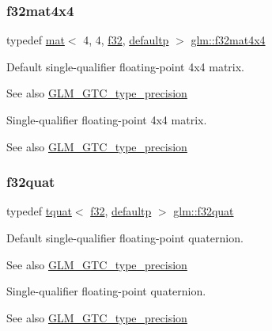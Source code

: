\subsubsection{\texorpdfstring{f32mat4x4}{f32mat4x4}}
{\footnotesize\ttfamily typedef \mbox{\hyperlink{structglm_1_1mat}{mat}}$<$ 4, 4, \mbox{\hyperlink{group__gtc__type__precision_ga0ec999b57f5330d9021256e96038df04}{f32}}, \mbox{\hyperlink{namespaceglm_a36ed105b07c7746804d7fdc7cc90ff25a9d21ccd8b5a009ec7eb7677befc3bf51}{defaultp}} $>$ \mbox{\hyperlink{group__gtc__type__precision_ga2ba95a5c37eef05b26ac10e03daa5c84}{glm\+::f32mat4x4}}}

Default single-\/qualifier floating-\/point 4x4 matrix. \begin{DoxySeeAlso}{See also}
\mbox{\hyperlink{group__gtc__type__precision}{G\+L\+M\+\_\+\+G\+T\+C\+\_\+type\+\_\+precision}}
\end{DoxySeeAlso}
Single-\/qualifier floating-\/point 4x4 matrix. \begin{DoxySeeAlso}{See also}
\mbox{\hyperlink{group__gtc__type__precision}{G\+L\+M\+\_\+\+G\+T\+C\+\_\+type\+\_\+precision}} 
\end{DoxySeeAlso}
\mbox{\label{group__gtc__type__precision_gac59c4d798396552e4bbb866b3d8a2f18}} 
\subsubsection{\texorpdfstring{f32quat}{f32quat}}
{\footnotesize\ttfamily typedef \mbox{\hyperlink{structglm_1_1tquat}{tquat}}$<$ \mbox{\hyperlink{group__gtc__type__precision_ga0ec999b57f5330d9021256e96038df04}{f32}}, \mbox{\hyperlink{namespaceglm_a36ed105b07c7746804d7fdc7cc90ff25a9d21ccd8b5a009ec7eb7677befc3bf51}{defaultp}} $>$ \mbox{\hyperlink{group__gtc__type__precision_gac59c4d798396552e4bbb866b3d8a2f18}{glm\+::f32quat}}}

Default single-\/qualifier floating-\/point quaternion. \begin{DoxySeeAlso}{See also}
\mbox{\hyperlink{group__gtc__type__precision}{G\+L\+M\+\_\+\+G\+T\+C\+\_\+type\+\_\+precision}}
\end{DoxySeeAlso}
Single-\/qualifier floating-\/point quaternion. \begin{DoxySeeAlso}{See also}
\mbox{\hyperlink{group__gtc__type__precision}{G\+L\+M\+\_\+\+G\+T\+C\+\_\+type\+\_\+precision}} 
\end{DoxySeeAlso}
\mbox{\label{group__gtc__type__precision_ga27d40e360fd5b6ad39ca34ded8210b53}} 
